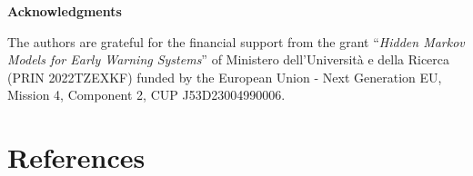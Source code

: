 \textbf{Acknowledgments}

The authors are grateful for the financial support from the grant
``\emph{Hidden Markov Models for Early Warning Systems}'' of Ministero
dell'Università e della Ricerca (PRIN 2022TZEXKF) funded by the European
Union - Next Generation EU, Mission 4, Component 2, CUP J53D23004990006.

\hypertarget{references}{%
\section{References}\label{references}}



\address{%
Fulvia Pennoni\\
University of Milano-Bicocca\\%
Department of Statistics and Quantitative Methods\\ Milan, Italy\\
%
\url{https://sites.google.com/view/fulviapennoni/home}\\%
\textit{ORCiD: \href{https://orcid.org/0000-0002-6631-7211}{0000-0002-6631-7211}}\\%
\href{mailto:fulvia.pennoni@unimib.it}{\nolinkurl{fulvia.pennoni@unimib.it}}%
}

\address{%
Silvia Pandolfi\\
University of Perugia\\%
Department of Economics\\ Perugia, Italy\\
%
\url{https://sites.google.com/site/spandolfihome/home}\\%
\textit{ORCiD: \href{https://orcid.org/0000-0002-6631-1211}{0000-0002-6631-1211}}\\%
\href{mailto:silvia.pandolfi@unipg.it}{\nolinkurl{silvia.pandolfi@unipg.it}}%
}

\address{%
Francesco Bartolucci\\
University of Perugia\\%
Department of Economics, Via A. Pascoli 8\\ Perugia, Italy\\
%
\url{https://sites.google.com/site/bartstatistics/}\\%
\textit{ORCiD: \href{https://orcid.org/0000-1721-1511-1101}{0000-1721-1511-1101}}\\%
\href{mailto:francesco.bartolucci@unipg.it}{\nolinkurl{francesco.bartolucci@unipg.it}}%
}
